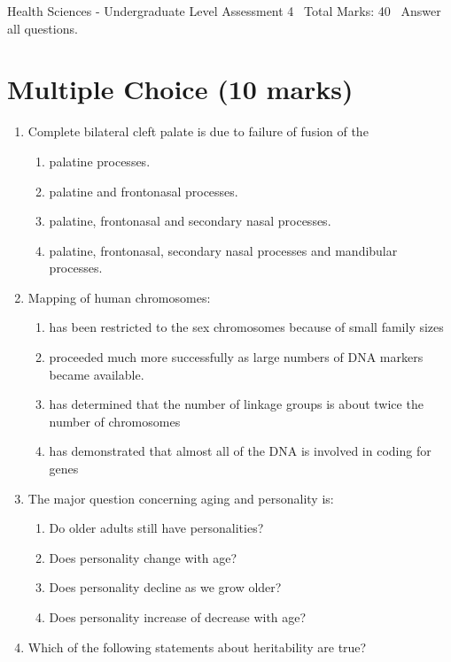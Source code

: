 \documentclass[12pt]{article}
\begin{document}
\begin{center}
Health Sciences - Undergraduate Level Assessment 4 \
Total Marks: 40 \
Answer all questions.
\end{center}

\section*{Multiple Choice (10 marks)}
\begin{enumerate}[label=\arabic*.]
\item Complete bilateral cleft palate is due to failure of fusion of the
\begin{enumerate}[label=(\alph*)]
    \item palatine processes.
    \item palatine and frontonasal processes.
    \item palatine, frontonasal and secondary nasal processes.
    \item palatine, frontonasal, secondary nasal processes and mandibular processes.
\end{enumerate}
\item Mapping of human chromosomes:
\begin{enumerate}[label=(\alph*)]
    \item has been restricted to the sex chromosomes because of small family sizes
    \item proceeded much more successfully as large numbers of DNA markers became available.
    \item has determined that the number of linkage groups is about twice the number of chromosomes
    \item has demonstrated that almost all of the DNA is involved in coding for genes
\end{enumerate}
\item The major question concerning aging and personality is:
\begin{enumerate}[label=(\alph*)]
    \item Do older adults still have personalities?
    \item Does personality change with age?
    \item Does personality decline as we grow older?
    \item Does personality increase of decrease with age?
\end{enumerate}
\item Which of the following statements about heritability are true?
\begin{enumerate}[label=(\alph*)]

\end{enumerate}
\end{enumerate}
\end{document}
